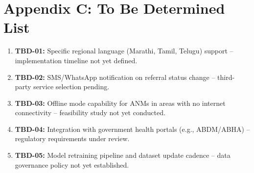 \documentclass[12pt,a4paper]{article}
\begin{document}
\section*{Appendix C: To Be Determined List}

\begin{enumerate}
    \item \textbf{TBD-01:} Specific regional language (Marathi, Tamil, Telugu) support -- implementation timeline not yet defined.
    \item \textbf{TBD-02:} SMS/WhatsApp notification on referral status change -- third-party service selection pending.
    \item \textbf{TBD-03:} Offline mode capability for ANMs in areas with no internet connectivity -- feasibility study not yet conducted.
    \item \textbf{TBD-04:} Integration with government health portals (e.g., ABDM/ABHA) -- regulatory requirements under review.
    \item \textbf{TBD-05:} Model retraining pipeline and dataset update cadence -- data governance policy not yet established.
\end{enumerate}
\end{document}
